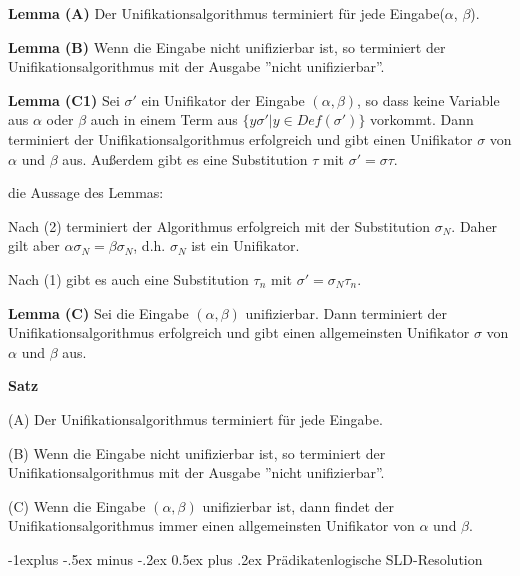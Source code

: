 \documentclass[a4paper]{article}
\makeatletter
\renewcommand{\note}[2]{\begin{noteBox} \textbf{#1} #2 \end{noteBox}}
\renewcommand{\subsection}{\@startsection{subsection}{2}{0mm}%
                {-1explus -.5ex minus -.2ex}%
                {0.5ex plus .2ex}%
                {\normalfont\normalsize\bfseries}}
\makeatother
\begin{document}
\begin{multicols}{3}
  \note{Lemma (A)}{Der Unifikationsalgorithmus terminiert für jede Eingabe($\alpha$, $\beta$).}

  \note{Lemma (B)}{Wenn die Eingabe nicht unifizierbar ist, so terminiert der Unifikationsalgorithmus mit der Ausgabe ''nicht unifizierbar''.}

  \note{Lemma (C1)}{Sei $\sigma'$ ein Unifikator der Eingabe $(\alpha,\beta)$, so dass keine Variable aus $\alpha$ oder $\beta$ auch in einem Term aus $\{y\sigma'|y\in Def(\sigma')\}$ vorkommt. Dann terminiert der Unifikationsalgorithmus erfolgreich und gibt einen Unifikator $\sigma$ von $\alpha$ und $\beta$ aus. Außerdem gibt es eine Substitution $\tau$ mit $\sigma'=\sigma\tau$.}

  die Aussage des Lemmas:
  \begin{itemize*}
    \item Nach (2) terminiert der Algorithmus erfolgreich mit der Substitution $\sigma_N$. Daher gilt aber $\alpha\sigma_N=\beta\sigma_N$, d.h. $\sigma_N$ ist ein Unifikator.
    \item Nach (1) gibt es auch eine Substitution $\tau_n$ mit $\sigma'=\sigma_N\tau_n$.
  \end{itemize*}

  \note{Lemma (C)}{Sei die Eingabe $(\alpha,\beta)$ unifizierbar. Dann terminiert der Unifikationsalgorithmus erfolgreich und gibt einen allgemeinsten Unifikator $\sigma$ von $\alpha$ und $\beta$ aus.}

  \note{Satz}{
    \begin{itemize*}
      \item (A) Der Unifikationsalgorithmus terminiert für jede Eingabe.
      \item (B) Wenn die Eingabe nicht unifizierbar ist, so terminiert der Unifikationsalgorithmus mit der Ausgabe ''nicht unifizierbar''.
      \item (C) Wenn die Eingabe $(\alpha,\beta)$ unifizierbar ist, dann findet der Unifikationsalgorithmus immer einen allgemeinsten Unifikator von $\alpha$ und $\beta$.
    \end{itemize*}
  }

  \subsection{Prädikatenlogische SLD-Resolution}


\end{multicols}
\end{document}
